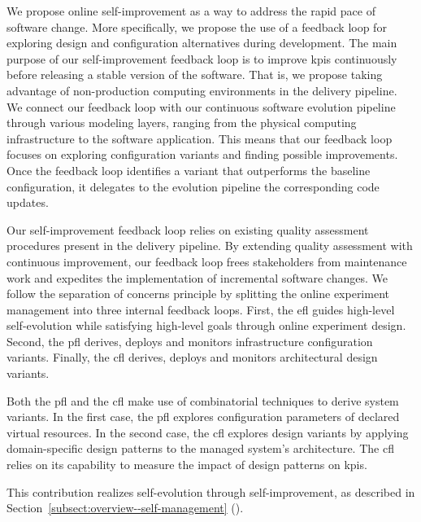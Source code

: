 \begin{description}[style=unboxed,leftmargin=0cm,font=\bfseries\normalsize]
	\item[Quality-driven Self-Improvement Feedback Loop\autodot]

	We propose online self-improvement as a way to address the rapid pace of software change. More specifically, we propose the use of a feedback loop for exploring design and configuration alternatives during development. The main purpose of our self-improvement feedback loop is to improve \glspl{kpi} continuously before releasing a stable version of the software. That is, we propose taking advantage of non-production computing environments in the delivery pipeline. We connect our feedback loop with our continuous software evolution pipeline through various modeling layers, ranging from the physical computing infrastructure to the software application. This means that our feedback loop focuses on exploring configuration variants and finding possible improvements. Once the feedback loop identifies a variant that outperforms the baseline configuration, it delegates to the evolution pipeline the corresponding code updates.

	Our self-improvement feedback loop relies on existing quality assessment procedures present in the delivery pipeline. By extending quality assessment with continuous improvement, our feedback loop frees stakeholders from maintenance work and expedites the implementation of incremental software changes. We follow the separation of concerns principle by splitting the online experiment management into three internal feedback loops. First, the \gls{efl} guides high-level self-evolution while satisfying high-level goals through online experiment design. Second, the \gls{pfl} derives, deploys and monitors infrastructure configuration variants. Finally, the \gls{cfl} derives, deploys and monitors architectural design variants.

	Both the \gls{pfl} and the \gls{cfl} make use of combinatorial techniques to derive system variants. In the first case, the \gls{pfl} explores configuration parameters of declared virtual resources. In the second case, the \gls{cfl} explores design variants by applying domain-specific design patterns to the managed system's architecture. The \gls{cfl} relies on its capability to measure the impact of design patterns on \glspl{kpi}.

	This contribution realizes self-evolution through self-improvement, as described in Section~\ref{subsect:overview--self-management} ().


\end{description}
